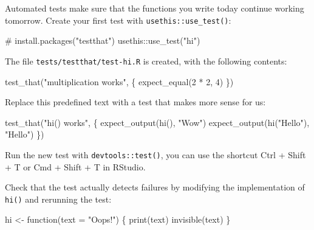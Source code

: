 \documentclass[]{book}
\newenvironment{Shaded}{}{}
\newcommand{\CommentTok}[1]{\textcolor[rgb]{0.00,0.50,0.00}{#1}}
\newcommand{\ControlFlowTok}[1]{\textcolor[rgb]{0.00,0.00,1.00}{#1}}
\newcommand{\DataTypeTok}[1]{#1}
\newcommand{\DecValTok}[1]{#1}
\newcommand{\KeywordTok}[1]{\textcolor[rgb]{0.00,0.00,1.00}{#1}}
\newcommand{\NormalTok}[1]{#1}
\newcommand{\OperatorTok}[1]{#1}
\newcommand{\StringTok}[1]{\textcolor[rgb]{0.00,0.50,0.50}{#1}}
\begin{document}
Automated tests make sure that the functions you write today continue working tomorrow.
Create your first test with \texttt{usethis::use\_test()}:

\begin{Shaded}
\begin{Highlighting}[]
\CommentTok{# install.packages("testthat")}
\NormalTok{usethis}\OperatorTok{::}\KeywordTok{use_test}\NormalTok{(}\StringTok{"hi"}\NormalTok{)}
\end{Highlighting}
\end{Shaded}

The file \texttt{tests/testthat/test-hi.R} is created, with the following contents:

\begin{Shaded}
\begin{Highlighting}[]
\KeywordTok{test_that}\NormalTok{(}\StringTok{"multiplication works"}\NormalTok{, \{}
  \KeywordTok{expect_equal}\NormalTok{(}\DecValTok{2} \OperatorTok{*}\StringTok{ }\DecValTok{2}\NormalTok{, }\DecValTok{4}\NormalTok{)}
\NormalTok{\})}
\end{Highlighting}
\end{Shaded}

Replace this predefined text with a test that makes more sense for us:

\begin{Shaded}
\begin{Highlighting}[]
\KeywordTok{test_that}\NormalTok{(}\StringTok{"hi() works"}\NormalTok{, \{}
  \KeywordTok{expect_output}\NormalTok{(}\KeywordTok{hi}\NormalTok{(), }\StringTok{"Wow"}\NormalTok{)}
  \KeywordTok{expect_output}\NormalTok{(}\KeywordTok{hi}\NormalTok{(}\StringTok{"Hello"}\NormalTok{), }\StringTok{"Hello"}\NormalTok{)}
\NormalTok{\})}
\end{Highlighting}
\end{Shaded}

Run the new test with \texttt{devtools::test()}, you can use the shortcut Ctrl + Shift + T or Cmd + Shift + T in RStudio.

Check that the test actually detects failures by modifying the implementation of \texttt{hi()} and rerunning the test:

\begin{Shaded}
\begin{Highlighting}[]
\NormalTok{hi <-}\StringTok{ }\ControlFlowTok{function}\NormalTok{(}\DataTypeTok{text =} \StringTok{"Oops!"}\NormalTok{) \{}
  \KeywordTok{print}\NormalTok{(text)}
  \KeywordTok{invisible}\NormalTok{(text)}
\NormalTok{\}}
\end{Highlighting}
\end{Shaded}
\end{document}
